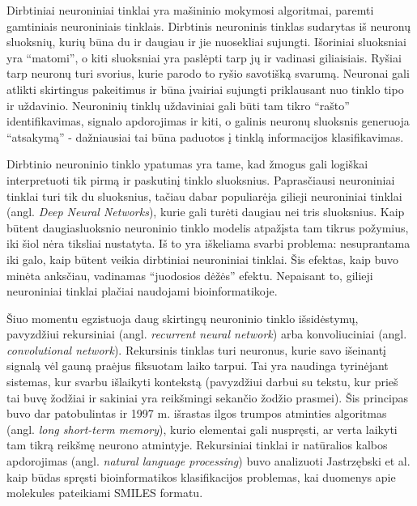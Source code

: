 Dirbtiniai neuroniniai tinklai yra mašininio mokymosi algoritmai, paremti gamtiniais neuroniniais tinklais.\cite{ragoza_proteinligand_2017} Dirbtinis neuroninis tinklas sudarytas iš neuronų sluoksnių, kurių būna du ir daugiau ir jie nuosekliai sujungti. Išoriniai sluoksniai yra \enquote{matomi}, o kiti sluoksniai yra paslėpti tarp jų ir vadinasi giliaisiais.\cite{schmidhuber_deep_2015} Ryšiai tarp neuronų turi svorius, kurie parodo to ryšio savotišką svarumą. Neuronai gali atlikti skirtingus pakeitimus ir būna įvairiai sujungti priklausant nuo tinklo tipo ir uždavinio. Neuroninių tinklų uždaviniai gali būti tam tikro \enquote{rašto} identifikavimas, signalo apdorojimas ir kiti, o galinis neuronų sluoksnis generuoja \enquote{atsakymą} - dažniausiai tai būna paduotos į tinklą informacijos klasifikavimas.\cite{ragoza_proteinligand_2017}

Dirbtinio neuroninio tinklo ypatumas yra tame, kad žmogus gali logiškai interpretuoti tik pirmą ir paskutinį tinklo sluoksnius. Paprasčiausi neuroniniai tinklai turi tik du sluoksnius, tačiau dabar populiarėja gilieji neuroniniai tinklai (angl. \textit{Deep Neural Networks}), kurie gali turėti daugiau nei tris sluoksnius. Kaip būtent daugiasluoksnio neuroninio tinklo modelis atpažįsta tam tikrus požymius, iki šiol nėra tiksliai nustatyta. Iš to yra iškeliama svarbi problema: nesuprantama iki galo, kaip būtent veikia dirbtiniai neuroniniai tinklai. Šis efektas, kaip buvo minėta anksčiau, vadinamas \enquote{juodosios dėžės} efektu. Nepaisant to, gilieji neuroniniai tinklai plačiai naudojami bioinformatikoje.\cite{chen_hidden_2019}\cite{stepniewska-dziubinska_development_2018}

Šiuo momentu egzistuoja daug skirtingų neuroninio tinklo išsidėstymų, pavyzdžiui rekursiniai (angl. \textit{recurrent neural network}) arba konvoliuciniai (angl. \textit{convolutional network}). Rekursinis tinklas turi neuronus, kurie savo išeinantį signalą vėl gauną praėjus fiksuotam laiko tarpui. Tai yra naudinga tyrinėjant sistemas, kur svarbu išlaikyti kontekstą (pavyzdžiui darbui su tekstu, kur prieš tai buvę žodžiai ir sakiniai yra reikšmingi sekančio žodžio prasmei). Šis principas buvo dar patobulintas ir 1997 m. išrastas ilgos trumpos atminties algoritmas (angl. \textit{long short-term memory}), kurio elementai gali nuspręsti, ar verta laikyti tam tikrą reikšmę neurono atmintyje. Rekursiniai tinklai ir natūralios kalbos apdorojimas (angl. \textit{natural language processing}) buvo analizuoti Jastrzębski et al.\cite{jastrzebski_learning_2018} kaip būdas spręsti bioinformatikos klasifikacijos problemas, kai duomenys apie molekules pateikiami SMILES formatu.

